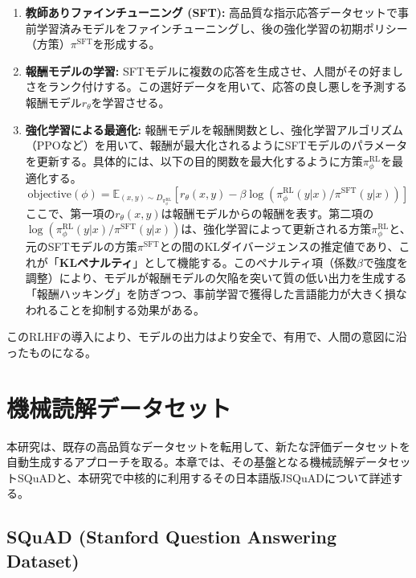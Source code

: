 \documentclass[a4paper,11pt]{jreport}
\begin{document}
\begin{enumerate}
  \item \textbf{教師ありファインチューニング (SFT):}
  高品質な指示応答データセットで事前学習済みモデルをファインチューニングし、後の強化学習の初期ポリシー（方策）$\pi^{\text{SFT}}$を形成する。

  \item \textbf{報酬モデルの学習:}
  SFTモデルに複数の応答を生成させ、人間がその好ましさをランク付けする。この選好データを用いて、応答の良し悪しを予測する報酬モデル$r_{\theta}$を学習させる。

  \item \textbf{強化学習による最適化:}
  報酬モデルを報酬関数とし、強化学習アルゴリズム（PPOなど）を用いて、報酬が最大化されるようにSFTモデルのパラメータを更新する。具体的には、以下の目的関数を最大化するように方策$\pi_{\phi}^{\text{RL}}$を最適化する\cite{InstructGPT}。
  $$
  \text{objective}(\phi) = \mathbb{E}_{(x,y) \sim D_{\pi_{\phi}^{\text{RL}}}} [r_{\theta}(x, y) - \beta \log(\pi_{\phi}^{\text{RL}}(y|x) / \pi^{\text{SFT}}(y|x))]
  $$
  ここで、第一項の$r_{\theta}(x, y)$は報酬モデルからの報酬を表す。第二項の$\log(\pi_{\phi}^{\text{RL}}(y|x) / \pi^{\text{SFT}}(y|x))$は、強化学習によって更新される方策$\pi_{\phi}^{\text{RL}}$と、元のSFTモデルの方策$\pi^{\text{SFT}}$との間のKLダイバージェンスの推定値であり、これが「\textbf{KLペナルティ}」として機能する。このペナルティ項（係数$\beta$で強度を調整）により、モデルが報酬モデルの欠陥を突いて質の低い出力を生成する「報酬ハッキング」を防ぎつつ、事前学習で獲得した言語能力が大きく損なわれることを抑制する効果がある。
\end{enumerate}
このRLHFの導入により、モデルの出力はより安全で、有用で、人間の意図に沿ったものになる。









\chapter{機械読解データセット}
\label{chap:datasets}
本研究は、既存の高品質なデータセットを転用して、新たな評価データセットを自動生成するアプローチを取る。本章では、その基盤となる機械読解データセットSQuADと、本研究で中核的に利用するその日本語版JSQuADについて詳述する。

\section{SQuAD (Stanford Question Answering Dataset)}
\end{document}
